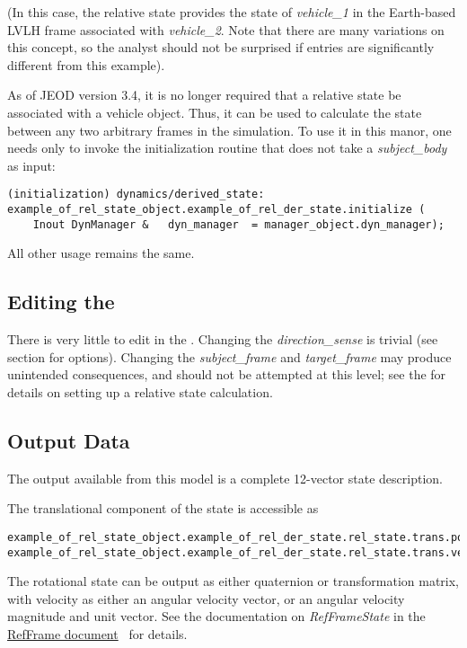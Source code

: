 (In this case, the relative state provides the state of \textit{vehicle\_1} in the Earth-based LVLH frame associated with \textit{vehicle\_2}.  Note that there are many variations on this concept, so the analyst should not be surprised if entries are significantly different from this example).

As of JEOD version 3.4, it is no longer required that a relative state be associated with a vehicle object. Thus, it can be used to calculate the state between any two arbitrary frames in the simulation. To use it in this manor, one needs only to invoke the initialization routine that does not take a \textit{subject\_body} as input:

\begin{verbatim}
(initialization) dynamics/derived_state:
example_of_rel_state_object.example_of_rel_der_state.initialize (
    Inout DynManager &   dyn_manager  = manager_object.dyn_manager);
\end{verbatim}

All other usage remains the same.

\subsection{Editing the \RelativeDescT}
There is very little to edit in the \RelativeDesc.  Changing the \textit{direction\_sense} is trivial (see section  for options).  Changing the \textit{subject\_frame} and \textit{target\_frame} may produce unintended consequences, and should not be attempted at this level; see the  for details on setting up a relative state calculation.


\subsection{Output Data}
The output available from this model is a complete 12-vector state description.

The translational component of the state is accessible as
\begin{verbatim}
example_of_rel_state_object.example_of_rel_der_state.rel_state.trans.position
example_of_rel_state_object.example_of_rel_der_state.rel_state.trans.velocity
\end{verbatim}
The rotational state can be output as either quaternion or transformation matrix, with velocity as either an angular velocity vector, or an angular velocity magnitude and unit vector.  See the documentation on \textit{RefFrameState} in the \href{file:\JEODHOME/models/utils/ref_frames/docs/ref_frames.pdf}{RefFrame document}~\cite{dynenv:REFFRAMES} for details.

